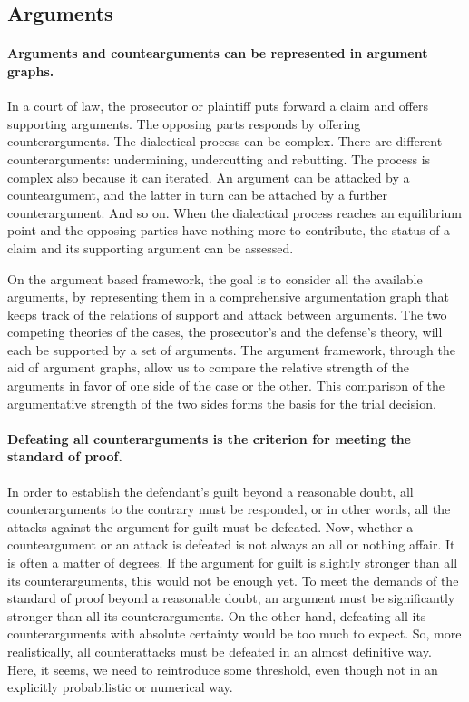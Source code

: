 \documentclass[10pt]{article}
\begin{document}
\subsection{Arguments}


\paragraph{Arguments and countearguments can be represented in argument graphs.}

In a court of law, the prosecutor or plaintiff puts forward a claim and offers supporting arguments. The opposing parts responds by offering counterarguments. The dialectical process can be complex. There are different counterarguments: undermining,  undercutting and rebutting. The process is complex also because it can iterated. 
An argument can be attacked by a counteargument, and the latter in turn can be attached by a further counterargument. And so on. 
When the dialectical process reaches an equilibrium point and the opposing parties have nothing more to contribute, 
the status of a claim and its supporting argument can be assessed. 

On the argument based 
framework, the goal is to consider all the available arguments, by representing them in a comprehensive argumentation graph that 
keeps track of the relations of support and attack between arguments. The two competing theories of the cases, the prosecutor's and the defense's theory, will each
be supported by a set of arguments. The argument framework, through the aid of argument graphs, allow us to 
compare the relative strength of the arguments in favor of one side of the case or the other. This comparison of the argumentative strength of the two sides 
forms the basis for the trial decision.


\paragraph{Defeating all counterarguments is the criterion for meeting the standard of proof.}

In order to establish the defendant's guilt beyond a reasonable doubt, all counterarguments 
to the contrary must be responded, or in other words, all the attacks against the argument for guilt must be 
defeated. Now, whether a counteargument or an attack is defeated 
is not always an all or nothing affair. It is often a matter of degrees. 
If the argument for guilt is slightly stronger than all its counterarguments, this would not be enough yet. 
To meet the demands of the standard of proof beyond a reasonable doubt, an argument must be significantly 
stronger than all its counterarguments. On the other hand, defeating all its counterarguments with absolute certainty would be too much to expect. 
So, more realistically, all counterattacks must be defeated in an almost definitive way. Here, it seems, we need 
to reintroduce some threshold, even though not in an explicitly probabilistic or numerical way. 
\end{document}
